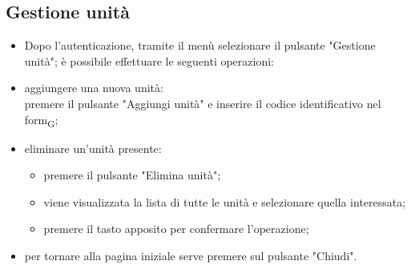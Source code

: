 \subsection{Gestione unità}
\begin{itemize}
\item Dopo l'autenticazione, tramite il menù selezionare il pulsante "Gestione unità"; è possibile effettuare le seguenti operazioni:
    \item aggiungere una nuova unità: \\premere il pulsante "Aggiungi unità" e inserire il codice identificativo nel form\textsubscript{G};
    \item eliminare un'unità presente: 
    \begin{itemize}
        \item premere il pulsante "Elimina unità";
        \item viene visualizzata la lista di tutte le unità e selezionare quella interessata;
        \item premere il tasto apposito per confermare l'operazione;
    \end{itemize}
    \item per tornare alla pagina iniziale serve premere sul pulsante "Chiudi".
\end{itemize}